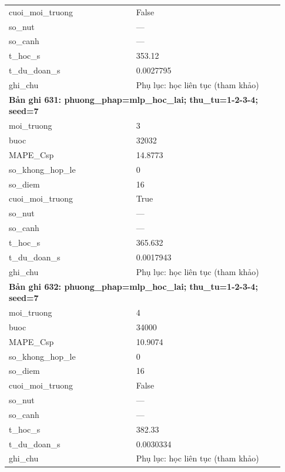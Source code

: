 \begin{longtable}{p{0.43\linewidth}p{0.50\linewidth}}
cuoi\_\allowbreak moi\_\allowbreak truong & False \\
so\_\allowbreak nut & — \\
so\_\allowbreak canh & — \\
t\_\allowbreak hoc\_\allowbreak s & 353.12 \\
t\_\allowbreak du\_\allowbreak doan\_\allowbreak s & 0.0027795 \\
ghi\_\allowbreak chu & Phụ lục: học liên tục (tham khảo) \\
\midrule
\multicolumn{2}{p{0.95\linewidth}}{\textbf{Bản ghi 631: phuong\_phap=mlp\_hoc\_lai; thu\_tu=1-2-3-4; seed=7}} \\
moi\_\allowbreak truong & 3 \\
buoc & 32032 \\
MAPE\_\allowbreak Csp & 14.8773 \\
so\_\allowbreak khong\_\allowbreak hop\_\allowbreak le & 0 \\
so\_\allowbreak diem & 16 \\
cuoi\_\allowbreak moi\_\allowbreak truong & True \\
so\_\allowbreak nut & — \\
so\_\allowbreak canh & — \\
t\_\allowbreak hoc\_\allowbreak s & 365.632 \\
t\_\allowbreak du\_\allowbreak doan\_\allowbreak s & 0.0017943 \\
ghi\_\allowbreak chu & Phụ lục: học liên tục (tham khảo) \\
\midrule
\multicolumn{2}{p{0.95\linewidth}}{\textbf{Bản ghi 632: phuong\_phap=mlp\_hoc\_lai; thu\_tu=1-2-3-4; seed=7}} \\
moi\_\allowbreak truong & 4 \\
buoc & 34000 \\
MAPE\_\allowbreak Csp & 10.9074 \\
so\_\allowbreak khong\_\allowbreak hop\_\allowbreak le & 0 \\
so\_\allowbreak diem & 16 \\
cuoi\_\allowbreak moi\_\allowbreak truong & False \\
so\_\allowbreak nut & — \\
so\_\allowbreak canh & — \\
t\_\allowbreak hoc\_\allowbreak s & 382.33 \\
t\_\allowbreak du\_\allowbreak doan\_\allowbreak s & 0.0030334 \\
ghi\_\allowbreak chu & Phụ lục: học liên tục (tham khảo) \\

\end{longtable}
